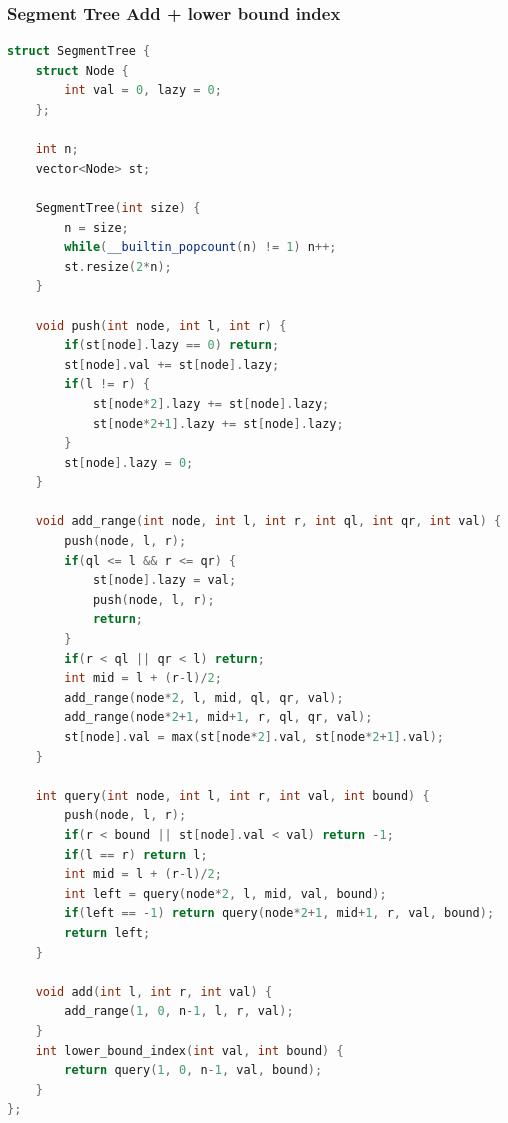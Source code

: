 \subsubsection{Segment Tree Add + lower bound index}
\begin{lstlisting}[style=mystyle, language=C++]
struct SegmentTree {
	struct Node {
		int val = 0, lazy = 0;
	};

	int n;
	vector<Node> st;

	SegmentTree(int size) {
		n = size;
		while(__builtin_popcount(n) != 1) n++;
		st.resize(2*n);
	}

	void push(int node, int l, int r) {
		if(st[node].lazy == 0) return;
		st[node].val += st[node].lazy;
		if(l != r) {
			st[node*2].lazy += st[node].lazy;
			st[node*2+1].lazy += st[node].lazy;
		}
		st[node].lazy = 0;
	}

	void add_range(int node, int l, int r, int ql, int qr, int val) {
		push(node, l, r);
		if(ql <= l && r <= qr) {
			st[node].lazy = val;
			push(node, l, r);
			return;
		}
		if(r < ql || qr < l) return;
		int mid = l + (r-l)/2;
		add_range(node*2, l, mid, ql, qr, val);
		add_range(node*2+1, mid+1, r, ql, qr, val);
		st[node].val = max(st[node*2].val, st[node*2+1].val);
	}

	int query(int node, int l, int r, int val, int bound) {
		push(node, l, r);
		if(r < bound || st[node].val < val) return -1;
		if(l == r) return l;
		int mid = l + (r-l)/2;
		int left = query(node*2, l, mid, val, bound);
		if(left == -1) return query(node*2+1, mid+1, r, val, bound);
		return left;
	}

	void add(int l, int r, int val) {
		add_range(1, 0, n-1, l, r, val);
	}
	int lower_bound_index(int val, int bound) {
		return query(1, 0, n-1, val, bound);
	}
};
\end{lstlisting}
